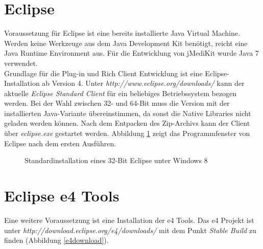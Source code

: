 \section{Eclipse}
Voraussetzung für Eclipse ist eine bereits installierte Java Virtual Machine. Werden keine Werkzeuge aus dem Java Development Kit benötigt, reicht eine Java Runtime Environment aus. Für die Entwicklung von jMediKit wurde Java 7 verwendet.\\
Grundlage für die Plug-in und Rich Client Entwicklung ist eine Eclipse-Installation ab Version 4. Unter \textit{http://www.eclipse.org/downloads/} kann der aktuelle \textit{Eclipse Standard Client} für ein beliebiges Betriebssystem bezogen werden. Bei der Wahl zwischen 32- und 64-Bit muss die Version mit der installierten Java-Variante übereinstimmen, da sonst die Native Libraries nicht geladen werden können. Nach dem Entpacken des Zip-Archivs kann der Client über \textit{eclipse.exe} gestartet werden. Abbildung \ref{eclipsestd} zeigt das Programmfenster von Eclipse nach dem ersten Ausführen.\\

\begin{figure}[H]
  \vspace{0.5cm}
  \centering
  \caption{Standardinstallation eines 32-Bit Eclipse unter Windows 8}
  \label{eclipsestd}
  \vspace{0.5cm}
\end{figure}

\section{Eclipse e4 Tools}
Eine weitere Voraussetzung ist eine Installation der e4 Tools. Das e4 Projekt ist unter \textit{http://download.eclipse.org/e4/downloads/} mit dem Punkt \textit{Stable Build} zu finden (Abbildung \ref{e4download}). 

